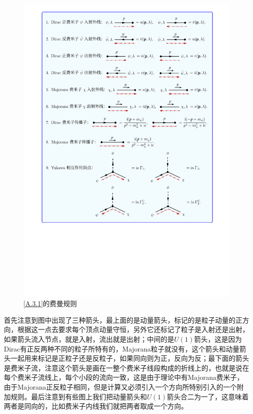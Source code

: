 \begin{figure}[htbp]
	\centering
	\includegraphics[width=\linewidth]{figs/fig19.pdf}
	\caption{\ref{A.3.1}的费曼规则}
	\label{fig.A.3.1}
\end{figure}

首先注意到图中出现了三种箭头，最上面的是动量箭头，标记的是粒子动量的正方向，根据这一点去要求每个顶点动量守恒，另外它还标记了粒子是入射还是出射，如果箭头流入节点，就是入射，流出就是出射；中间的是$U(1)$箭头，这是因为Dirac有正反两种不同的粒子所特有的，Majorana粒子就没有，这个箭头和动量箭头一起用来标记是正粒子还是反粒子，如果同向则为正，反向为反；最下面的箭头是费米子流，注意这个箭头是画在一整个费米子线段构成的折线上的，也就是说在每个费米子流线上，每个小段的流向一致，这是由于理论中有Majorana费米子，由于Majorana正反粒子相同，但是计算又必须引入一个方向所特别引入的一个附加规则。最后注意到有些图上我们把动量箭头和$U(1)$箭头合二为一了，这意味着两者是同向的，比如费米子内线我们就把两者取成一个方向。

